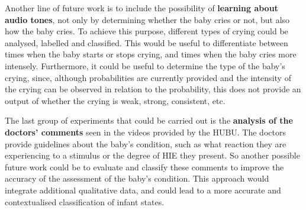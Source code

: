 Another line of future work is to include the possibility of \textbf{learning about audio tones}, not only by determining whether the baby cries or not, but also how the baby cries. To achieve this purpose, different types of crying could be analysed, labelled and classified. This would be useful to differentiate between times when the baby starts or stops crying, and times when the baby cries more intensely. Furthermore, it could be useful to determine the type of the baby's crying, since, although probabilities are currently provided and the intensity of the crying can be observed in relation to the probability, this does not provide an output of whether the crying is weak, strong, consistent, etc.


The last group of experiments that could be carried out is the \textbf{analysis of the doctors' comments} seen in the videos provided by the HUBU. The doctors provide guidelines about the baby's condition, such as what reaction they are experiencing to a stimulus or the degree of HIE they present. So another possible future work could be to evaluate and classify these comments to improve the accuracy of the assessment of the baby's condition. This approach would integrate additional qualitative data, and could lead to a more accurate and contextualised classification of infant states.


